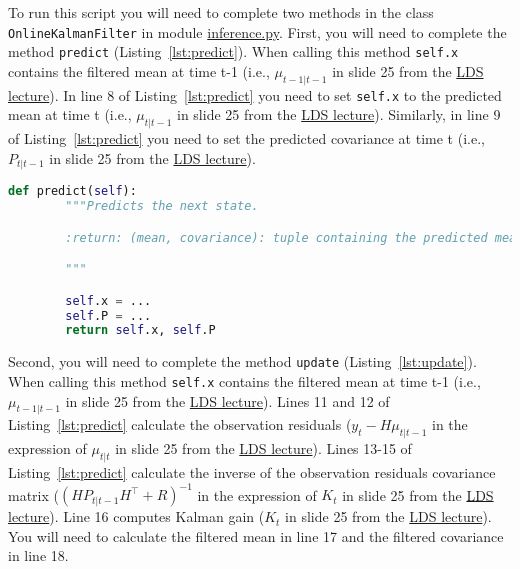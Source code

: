 \documentclass[12pt]{article}
\begin{document}
To run this script you will need to complete two methods in the class
\texttt{OnlineKalmanFilter} in module
\href{https://github.com/joacorapela/neuroinformatics24/blob/master/worksheets/07_linearDynamicalSystems/code/src/inference.py}{inference.py}.
%
First, you will need to complete the method \texttt{predict}
(Listing~\ref{lst:predict}). When calling this method \texttt{self.x} contains
the filtered mean at time t-1 (i.e., $\mu_{t-1|t-1}$ in slide 25 from the
\href{https://github.com/joacorapela/neuroinformatics24/blob/master/lectures/07_linearDynamicalSystems/LDS_SWCNeuroinf2024.pdf}{LDS
lecture}). In line 8 of Listing~\ref{lst:predict} you need to set
\texttt{self.x} to the predicted mean at time t (i.e., $\mu_{t|t-1}$ in slide
25 from the
\href{https://github.com/joacorapela/neuroinformatics24/blob/master/lectures/07_linearDynamicalSystems/LDS_SWCNeuroinf2024.pdf}{LDS
lecture}). Similarly, in line 9 of Listing~\ref{lst:predict} you need to set
the predicted covariance at time t (i.e., $P_{t|t-1}$ in slide 25 from the
\href{https://github.com/joacorapela/neuroinformatics24/blob/master/lectures/07_linearDynamicalSystems/LDS_SWCNeuroinf2024.pdf}{LDS lecture}). 

\begin{lstlisting}[caption={method \texttt{predict} in class \texttt{OnlineKalmanFilter} in module \texttt{inference.py}},label={lst:predict},language=python]
    def predict(self):
        """Predicts the next state.

        :return: (mean, covariance): tuple containing the predicted mean and covariance matrix.

        """

        self.x = ...
        self.P = ...
        return self.x, self.P
\end{lstlisting}

Second, you will need to complete the method \texttt{update}
(Listing~\ref{lst:update}). When calling this method \texttt{self.x} contains
the filtered mean at time t-1 (i.e., $\mu_{t-1|t-1}$ in slide 25 from the
\href{https://github.com/joacorapela/neuroinformatics24/blob/master/lectures/07_linearDynamicalSystems/LDS_SWCNeuroinf2024.pdf}{LDS
lecture}).
%
Lines 11 and 12 of Listing~\ref{lst:predict} calculate the observation
residuals ($y_t-H\mu_{t|t-1}$ in the expression of $\mu_{t|t}$ in slide 25 from
the
\href{https://github.com/joacorapela/neuroinformatics24/blob/master/lectures/07_linearDynamicalSystems/LDS_SWCNeuroinf2024.pdf}{LDS
lecture}).
%
Lines 13-15 of Listing~\ref{lst:predict} calculate the inverse of the
observation residuals covariance matrix ($(HP_{t|t-1}H^\intercal+R)^{-1}$ in
the expression of $K_t$ in slide 25 from the
\href{https://github.com/joacorapela/neuroinformatics24/blob/master/lectures/07_linearDynamicalSystems/LDS_SWCNeuroinf2024.pdf}{LDS
lecture}).
%
Line 16 computes Kalman gain ($K_t$ in slide 25 from the
\href{https://github.com/joacorapela/neuroinformatics24/blob/master/lectures/07_linearDynamicalSystems/LDS_SWCNeuroinf2024.pdf}{LDS
lecture}).
%
You will need to calculate the filtered mean in line 17 and the filtered
covariance in line 18.
\end{document}
